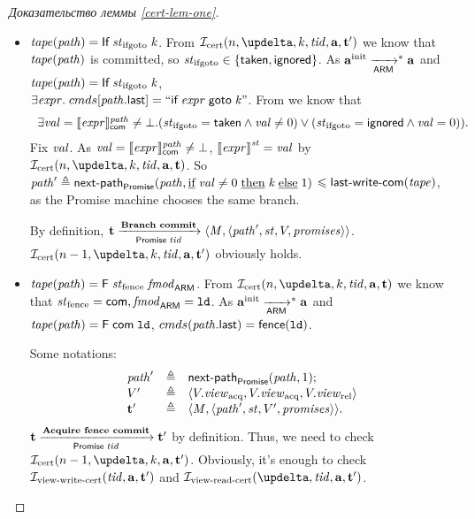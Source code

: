 \begin{proof}[Доказательство леммы \ref{cert-lem-one}]
\begin{itemize}
    \item $\tape(\cpath) = \tapeIfGoto{\IfState}{\z}$. From $\invCert(n, \delta, k, \tId, \aT, \tT')$ we know that
      $\mathit{tape}(\mathit{path})$ is committed, so $\mathit{st}_{\textup{\rm ifgoto}} \in \{\mathsf{taken}, \mathsf{ignored}\}$.
      As $\mathbf{a}^{\rm init} \xrightarrow[\mathsf{ARM}]{}^{*} \mathbf{a}$ and $\tape(\cpath) = \tapeIfGoto{\IfState}{\z}$, \\
      $\exists \mathit{expr}. \; {cmds}[\mathit{path}.\textup{\sf last}] = ``\textsf{if} \; \mathit{expr} \; \textsf{goto} \; \mathit{k}"$.
      From \app{\ref{inv:invATapeCfState}} we know that 
      \[\begin{array}{l}
        \exists \stval = \semfcom{\expr}{\cpath} \not = \bot.
          (\IfState = \Taken \land \stval \not = 0) \lor (\IfState = \Ignored \land \stval = 0)).
      \end{array}\]
      Fix $\mathit{val}$. As $\mathit{val} = \llbracket\mathit{expr}\rrbracket ^{\mathit{path}}_\mathsf{com} \not = \bot$, $|[\mathit{expr}|]^{\mathit{st}} = \mathit{val}$
      by $\invCert(n, \delta, k, \tId, \aT, \tT)$.
      So $\mathit{path}' \triangleq \mathsf{next}\textsf{-}\mathsf{path}_{\mathsf{Promise}}(\mathit{path}, \text{\underline{if}} \; \mathit{val} \not = 0 \; \text{\underline{then}} \; \mathit{k} \; \text{\underline{else}} \; 1)$
      $\leqslant \textup{\sf last-write-com}(\mathit{tape})$, as the Promise machine chooses the same branch.
      
      By definition, $\mathbf{t} \xrightarrow[\mathsf{Promise} \; \mathit{tid}]{\textbf{Branch commit}} \langle \mathit{M}, \langle \mathit{path}', \mathit{st}, V, \mathit{promises} \rangle \rangle$.
      $\invCert(n - 1, \delta, k, \tId, \aT, \tT')$ obviously holds.

    \item $\tape(\cpath) = \tapeFence{\Fstate}{\Ftype}$.
      From $\invCert(n, \delta, k, \tId, \aT, \tT)$ we know that $\mathit{st}_{\textup{\rm fence}} = \mathsf{com}, \mathit{fmod}_{\mathsf{ARM}} = \mathtt{ld}$.
      As $\mathbf{a}^{\rm init} \xrightarrow[\mathsf{ARM}]{}^{*} \mathbf{a}$ and $\mathit{tape}(\mathit{path}) = \textsf{F} \; \mathsf{com} \; \mathtt{ld}$,
      ${cmds}(\mathit{path}.\textup{\sf last}) = \mathsf{fence}({\mathtt{ld}})$.

      Some notations:
      \[\begin{array}{l l l}
        \mathit{path}' & \triangleq & \mathsf{next}\textsf{-}\mathsf{path}_{\mathsf{Promise}}(\mathit{path}, 1); \\
        V'     & \triangleq & \langle V.\mathit{view}_{\mathrm{acq}}, V.\mathit{view}_{\mathrm{acq}}, V.\mathit{view}_{\mathrm{rel}} \rangle \\
        \mathbf{t}'    & \triangleq & \langle \mathit{M}, \langle \mathit{path}', \mathit{st}, V', \mathit{promises} \rangle \rangle.
      \end{array}\]
      $\mathbf{t} \xrightarrow[\mathsf{Promise} \; \mathit{tid}]{\textbf{Acquire fence commit}} \mathbf{t}'$ by definition. Thus, we need to check $\invCert(n - 1, \delta, k, \aT, \tT')$.
      Obviously, it's enough to check $\mathcal{I}_{\textup{\rm view-write-cert}}(\mathit{tid}, \mathbf{a}, \mathbf{t}')$ and $\invViewReadCERT(\delta, \tId, \aT, \tT')$.


\end{itemize}
\end{proof}
